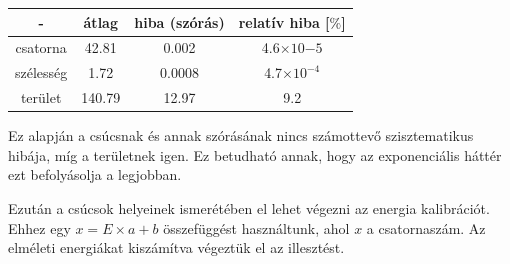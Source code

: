 \documentclass[a4paper,12pt]{article}
\begin{document}
\begin{center}
\begin{tabular}{|c|c|c|c|}
\hline
- & átlag & hiba (szórás) & relatív hiba [$\%$] \\
\hline
csatorna & 42.81 & 0.002 & 4.6$\times 10{-5}$ \\
\hline
szélesség & 1.72 & 0.0008 & 4.7$\times 10^{-4}$ \\
\hline
terület & 140.79 & 12.97 & 9.2 \\
\hline

\end{tabular}
\end{center}

\par Ez alapján a csúcsnak és annak szórásának nincs számottevő szisztematikus hibája, míg a területnek igen. Ez betudható annak, hogy az exponenciális háttér ezt befolyásolja a legjobban.

\newpage

\par Ezután a csúcsok helyeinek ismerétében el lehet végezni az energia kalibrációt. Ehhez egy $x = E\times a + b$ összefüggést használtunk, ahol $x$ a csatornaszám. Az elméleti energiákat kiszámítva végeztük el az illesztést.
\end{document}
